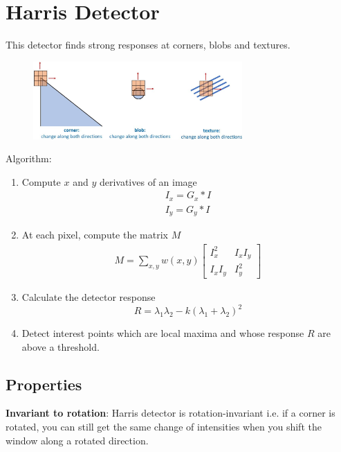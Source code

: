 \documentclass{report}
\begin{document}
\section{Harris Detector}

This detector finds strong responses at corners, blobs and textures.
\begin{figure}[h]
    \centering
    \includegraphics[width=8cm]{Harris detector.JPG}
\end{figure}

Algorithm:
\begin{enumerate}
    \item Compute $x$ and $y$ derivatives of an image 
    \begin{gather*}
        I_x = G_x * I \\ 
        I_y = G_y * I
    \end{gather*}
    
    \item At each pixel, compute the matrix $M$
    \begin{gather*}
        M = \sum_{x,y} w(x,y) \begin{bmatrix}
            I_x^2 & I_x I_y \\ 
            I_x I_y & I_y^2
        \end{bmatrix}
    \end{gather*}

    \item Calculate the detector response 
    $$
        R = \lambda_1 \lambda_2 - k(\lambda_1 + \lambda_2)^2
    $$

    \item Detect interest points which are local maxima and whose response $R$
    are above a threshold.
\end{enumerate}

\subsection{Properties}

\textbf{Invariant to rotation}: Harris detector is rotation-invariant i.e. if a
corner is rotated, you can still get the same change of intensities when you
shift the window along a rotated direction. 
\end{document}
